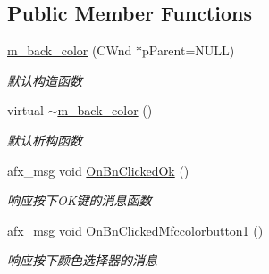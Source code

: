 \subsection*{Public Member Functions}
\begin{DoxyCompactItemize}
\item 
\mbox{\label{classm__back__color_aeefd0f40dbbf7170066d2fc589a553e5}} 
\hyperlink{classm__back__color_aeefd0f40dbbf7170066d2fc589a553e5}{m\+\_\+back\+\_\+color} (C\+Wnd $\ast$p\+Parent=N\+U\+LL)
\begin{DoxyCompactList}\small\item\em 默认构造函数 \end{DoxyCompactList}\item 
\mbox{\label{classm__back__color_a207a80f22a399786bdec9bb69a4a1eb4}} 
virtual \hyperlink{classm__back__color_a207a80f22a399786bdec9bb69a4a1eb4}{$\sim$m\+\_\+back\+\_\+color} ()
\begin{DoxyCompactList}\small\item\em 默认析构函数 \end{DoxyCompactList}\item 
\mbox{\label{classm__back__color_a06880581ac17b615d865c3d8360b8fcc}} 
afx\+\_\+msg void \hyperlink{classm__back__color_a06880581ac17b615d865c3d8360b8fcc}{On\+Bn\+Clicked\+Ok} ()
\begin{DoxyCompactList}\small\item\em 响应按下\+O\+K键的消息函数 \end{DoxyCompactList}\item 
\mbox{\label{classm__back__color_a5977217a5e1cb3bb7c6e9ca4bf5d2ed1}} 
afx\+\_\+msg void \hyperlink{classm__back__color_a5977217a5e1cb3bb7c6e9ca4bf5d2ed1}{On\+Bn\+Clicked\+Mfccolorbutton1} ()
\begin{DoxyCompactList}\small\item\em 响应按下颜色选择器的消息 \end{DoxyCompactList}\end{DoxyCompactItemize}
